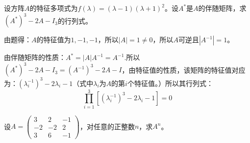 \documentclass[a4paper]{report}
\begin{document}
\EX 设方阵$A$的特征多项式为$f(\lambda)=(\lambda-1)(\lambda+1)^2$。设$A^*$是$A$的伴随矩阵，求$(A^*)^3-2A-I_3$的行列式。

\begin{jie}
由题得：$A$的特征值为$1,-1,-1$，所以$|A|=1\neq 0$，所以$A$可逆且$|A^{-1}|=1$。

由伴随矩阵的性质：$A^*=|A|A^{-1}=A^{-1}$.所以$(A^*)^3-2A-I_3=(A^{-1})^3-2A-I$，由特征值的性质，该矩阵的特征值对应为：$(\lambda_{i}^{-1})^3-2\lambda_{i}-1$（式中$\lambda_i$为$A$的第$i$个特征值。）所以其行列式：
\begin{equation*}
\prod_{i=1}^{3}\left[(\lambda_{i}^{-1})^3-2\lambda_{i}-1\right]=0
\end{equation*}
\end{jie}

\EX 设$
A=
\begin{pmatrix}
3&2&-1\\
-2&-2&2\\
3&6&-1
\end{pmatrix}
$，对任意的正整数$n$，求$A^{n}$。
\end{document}
